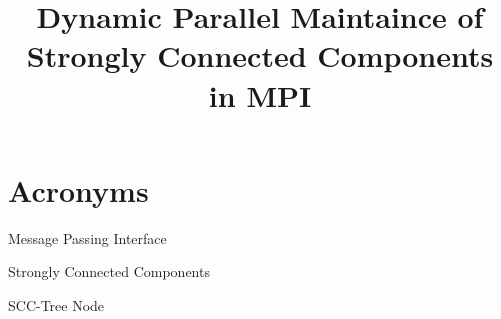 \documentclass{article}
\begin{document}
\title{Dynamic Parallel Maintaince of Strongly Connected Components in MPI}
\submitdate{\today}
\maketitle

\addtocounter{page}{-1}
\thispagestyle{empty}

\newpage
\null\vspace{2in}
\begin{abstract}

\end{abstract}
\vspace{\fill}
\thispagestyle{empty}


\newpage
\doublespacing
\tableofcontents
\singlespacing


\newpage

\section*{Acronyms}\label{Acronyms}
\begin{description}[style=unboxed,font=\small]
    \item[MPI:]\label{mpi} Message Passing Interface
    \item[SCC:]\label{scc} Strongly Connected Components
    \item[STN:]\label{stn} SCC-Tree Node
  \end{description}
\vspace{2em}

\listoffigures
{}
\vspace{2em}
\end{document}
